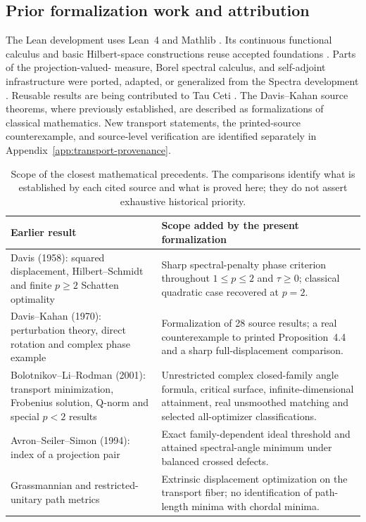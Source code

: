 \documentclass[11pt]{article}
\begin{document}
\subsection{Prior formalization work and attribution}
\label{sec:related-formal}

The Lean development uses Lean~4 and Mathlib
\citep{demoura2021lean4,mathlib2020}.  Its continuous functional
calculus and basic Hilbert-space constructions reuse accepted
foundations \citep{dedecker2025cfc}.  Parts of the projection-valued-
measure, Borel spectral calculus, and self-adjoint infrastructure were
ported, adapted, or generalized from the Spectra development
\citep{bornemann2026spectra}.  Reusable results are being contributed
to Tau Ceti \citep{tauceti2026}.  The Davis--Kahan source theorems,
where previously established, are described as formalizations of
classical mathematics.  New transport statements, the printed-source
counterexample, and source-level verification are identified separately
in Appendix~\ref{app:transport-provenance}.

\begin{table}[tbp]
\centering\small
\caption{Scope of the closest mathematical precedents. The comparisons
identify what is established by each cited source and what is proved here;
they do not assert exhaustive historical priority.}
\label{tab:related-comparison}
\begin{tabularx}{\textwidth}{@{}p{}X@{}}
\toprule
Earlier result & Scope added by the present formalization \\
\midrule
Davis (1958): squared displacement, Hilbert--Schmidt and finite
$p\ge2$ Schatten optimality \citep{davis1958separation}
 & Sharp spectral-penalty phase criterion throughout $1\le p\le2$ and
 $\tau\ge0$; classical quadratic case recovered at $p=2$. \\
Davis--Kahan (1970): perturbation theory, direct rotation and complex
phase example \citep{davis1970rotation}
 & Formalization of 28 source results; a real counterexample to printed
Proposition~4.4 and a sharp full-displacement comparison. \\
Bolotnikov--Li--Rodman (2001): transport minimization, Frobenius solution,
Q-norm and special $p<2$ results \citep{bolotnikov2001minimal}
 & Unrestricted complex closed-family angle formula, critical surface,
infinite-dimensional attainment, real unsmoothed matching and selected
all-optimizer classifications. \\
Avron--Seiler--Simon (1994): index of a projection pair
\citep{avron1994index}
 & Exact family-dependent ideal threshold and attained spectral-angle
minimum under balanced crossed defects. \\
Grassmannian and restricted-unitary path metrics
\citep{qiu2006grassmann,andruchow2010finsler,larotonda2026shortcurves}
 & Extrinsic displacement optimization on the transport fiber; no
identification of path-length minima with chordal minima. \\
\bottomrule
\end{tabularx}
\end{table}
\end{document}
